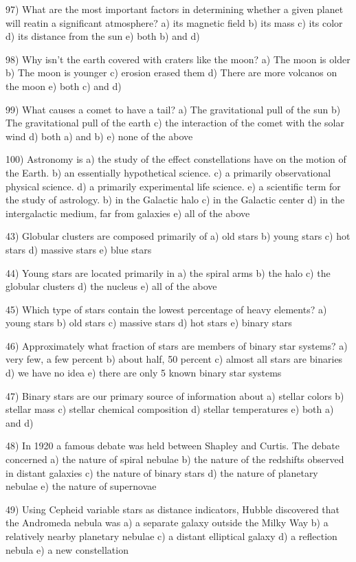 97) What are the most important factors in determining whether a given planet
will reatin a significant atmosphere?
a) its magnetic field
b) its mass
c) its color
d) its distance from the sun
e) both b) and d)

98) Why isn't the earth covered with craters like the moon?
a) The moon is older
b) The moon is younger
c) erosion erased them
d) There are more volcanos on the moon
e) both c) and d)

99) What causes a comet to have a tail?
a) The gravitational pull of the sun
b) The gravitational pull of the earth
c) the interaction of the comet with the solar wind
d) both a) and b)
e) none of the above

100) Astronomy is
a) the study of the effect constellations have on the motion of the Earth.
b) an essentially hypothetical science.
c) a primarily observational physical science.
d) a primarily experimental life science.
e) a scientific term for the study of astrology.
b) in the Galactic halo
c) in the Galactic center
d) in the intergalactic medium, far from galaxies
e) all of the above

43) Globular clusters are composed primarily of
a) old stars b) young stars c) hot stars d) massive stars e) blue stars

44) Young stars are located primarily in
a) the spiral arms b) the halo c) the globular clusters
d) the nucleus e) all of the above

45) Which type of stars contain the lowest percentage of heavy elements?
a) young stars b) old stars c) massive stars d) hot stars e) binary stars

46) Approximately what fraction of stars are members of binary star systems?
a) very few, a few percent b) about half, 50 percent
c) almost all stars are binaries d) we have no idea
e) there are only 5 known binary star systems

47) Binary stars are our primary source of information about
a) stellar colors b) stellar mass c) stellar chemical composition
d) stellar temperatures e) both a) and d)

48) In 1920 a famous debate was held between Shapley and Curtis.
The debate concerned
a) the nature of spiral nebulae
b) the nature of the redshifts observed in distant galaxies
c) the nature of binary stars
d) the nature of planetary nebulae
e) the nature of supernovae

49) Using Cepheid variable stars as distance indicators,
Hubble discovered that the Andromeda nebula was
a) a separate galaxy outside the Milky Way
b) a relatively nearby planetary nebulae
c) a distant elliptical galaxy
d) a reflection nebula
e) a new constellation

